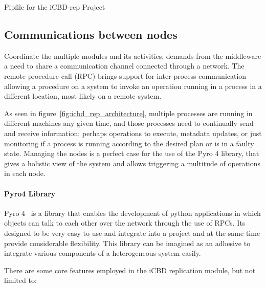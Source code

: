 \begin{listing}[ht]
\inputminted{python}{./Chapters/Code/cap4_pip.py}
\caption{Pipfile for the iCBD-rep Project}
\label{listing:impl_icbd_pipfile}
\end{listing}


\subsection{Communications between nodes}
\label{sub:impl_rep_comms}

Coordinate the multiple modules and its activities, demands from the middleware a need to share a communication channel connected through a network. 
The remote procedure call (RPC) brings support for inter-process communication allowing a procedure on a system to invoke an operation running in a process in a different location, most likely on a remote system.

As seen in figure~\ref{fig:icbd_rep_architecture}, multiple processes are running in different machines any given time, and those processes need to continually send and receive information: perhaps operations to execute, metadata updates, or just monitoring if a process is running according to the desired plan or is in a faulty state.
Managing the nodes is a perfect case for the use of the Pyro 4 library, that gives a holistic view of the system and allows triggering a multitude of operations in each node.


\paragraph{Pyro4 Library}
\label{par:impl_pyro4_lib}
Pyro 4~\cite{pyro4} is a library that enables the development of python applications in which objects can talk to each other over the network through the use of RPCs. Its designed to be very easy to use and integrate into a project and at the same time provide considerable flexibility. This library can be imagined as an adhesive to integrate various components of a heterogeneous system easily.

There are some core features employed in the iCBD replication module, but not limited to:



